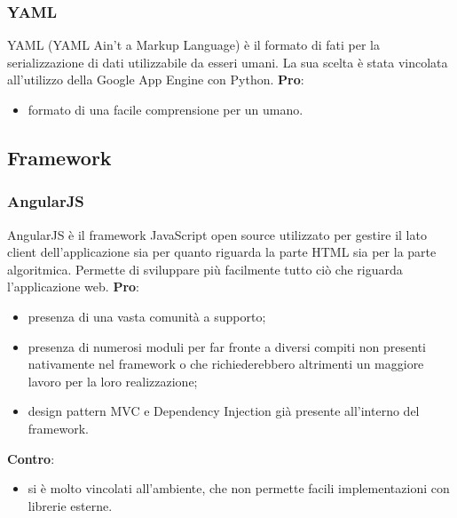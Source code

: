 		\subsubsection{YAML} %
		\label{ssub:yaml}
		YAML (YAML Ain't a Markup Language) è il formato di fati per la serializzazione di dati utilizzabile da esseri umani. \newline
		La sua scelta è stata vincolata all'utilizzo della Google App Engine con Python. \newline
		\textbf{Pro}:
			\begin{itemize}
				\item formato di una facile comprensione per un umano.
			\end{itemize}
		\noindent


	\subsection{Framework} %
	\label{sub:framework}
		\subsubsection{AngularJS} %
		\label{ssub:angularjs}
		AngularJS è il framework JavaScript open source utilizzato per gestire il lato client dell'applicazione sia per quanto riguarda la parte HTML sia per la parte algoritmica. Permette di sviluppare più facilmente tutto ciò che riguarda l'applicazione web. \newline
		\textbf{Pro}:
			\begin{itemize}
				\item presenza di una vasta comunità a supporto;
				\item presenza di numerosi moduli per far fronte a diversi compiti non presenti nativamente nel framework o che richiederebbero altrimenti un maggiore lavoro per la loro realizzazione;
				\item design pattern MVC e Dependency Injection già presente all'interno del framework.
			\end{itemize}
		\noindent
		\textbf{Contro}:
			\begin{itemize}
				\item si è molto vincolati all'ambiente, che non permette facili implementazioni con librerie esterne.
			\end{itemize}

